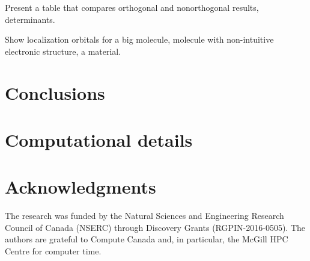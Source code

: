 \documentclass[aps,prl,reprint,amsmath,amssymb]{revtex4-1}
\begin{document}
Present a table that compares orthogonal and nonorthogonal results, determinants.

Show localization orbitals for a big molecule, molecule with non-intuitive electronic structure, a material.


\section{Conclusions}


\section{Computational details}


\section{Acknowledgments} 

The research was funded by the Natural Sciences and Engineering Research Council of Canada (NSERC) through Discovery
Grants (RGPIN-2016-0505). The authors are grateful to Compute Canada and, in particular, the McGill HPC Centre for computer time.



\end{document}
